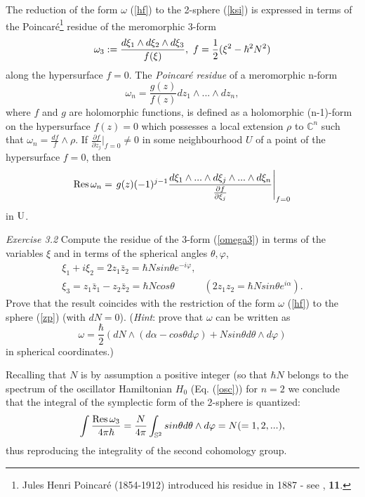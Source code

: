 The reduction of the form $\omega$ (\ref{hf}) to the 2-sphere (\ref{ksi}) is expressed in terms of the 
Poincar\'e\footnote{Jules Henri Poincar\'e (1854-1912)
introduced his residue in 1887 - see \cite{Poincare}, {\bf 11}.} residue of the meromorphic 3-form
\begin{equation}
\label{omega3}
\omega_3:= \frac{d\xi_1\wedge d\xi_2\wedge d\xi_3}{f({\bf \xi})}, \, \,
f = \frac{1}{2}({\xi}^2 - \hbar^2 N^2)
\end{equation}
along the hypersurface $f=0$. The {\it Poincar\'e residue} of a meromorphic n-form
\begin{equation}
\label{omega/n}
\omega_n = \frac{g(z)}{f(z)} dz_1\wedge ...\wedge dz_n,
\end{equation}
where $f$ and $g$ are holomorphic functions, is defined as a holomorphic 
(n-1)-form on the hypersurface $f(z) = 0$ which possesses a local extension 
$\rho$ to ${\mathbb C}^n$ such that $\omega_n =\frac{df}{f}\wedge \rho$. If
$\frac{\partial f}{\partial z_j}|_{f=0} \neq 0$ in some neighbourhood $U$ of
a point of the hypersurface $f=0$, then
\begin{equation}
\label{Res}
{\rm Res} \, \omega_n = \left. g(z) (-1)^{j-1}\frac{d\xi_{1} \wedge ... \wedge d\xi_{j} \wedge ... \wedge d\xi_{n}}{\frac{\partial f}{\partial \xi_{j}}} \right| _{f=0} %
\end{equation}
in $\rm{U}$. 

{\it Exercise 3.2} Compute the residue of the 3-form (\ref{omega3}) in terms of the variables $\xi$ and in terms of the spherical angles $\theta, \varphi$,
\begin{eqnarray}
\xi_1 + i\xi_2 = 2 z_1 {\bar z}_2 = \hbar N sin\theta e^{-i\varphi}, &  \\  \nonumber
\xi_3 =z_1{\bar z}_1 - z_2 {\bar z}_2 = \hbar N cos\theta  \; \; \; \; \; \; \;  & (2z_1 z_2 = \hbar N sin\theta e^{i\alpha}) .  
\end{eqnarray}
Prove that the result coincides with the restriction of the form $\omega$ (\ref{hf}) to the sphere (\ref{zp}) (with $dN = 0$). ({\it Hint}: prove that $\omega$ can be written as 
\begin{equation}
\label{sph}
\omega = \frac{\hbar}{2} (dN\wedge (d\alpha -cos\theta d\varphi) + 
N sin\theta d\theta \wedge d\varphi) 
\end{equation}
in spherical coordinates.) 

Recalling that $N$ is by assumption a positive integer (so that $\hbar N$ belongs to the spectrum  
of the oscillator Hamiltonian $H_0$ (Eq. (\ref{osc})) for $n=2$ we conclude that the integral of 
the symplectic form of the 2-sphere is quantized:
\begin{equation}
\label{N}
\int \frac{{\rm Res} \, \omega_3}{4\pi\hbar} = \frac{N}{4\pi} \int_{{\mathbb S}^2} 
sin\theta d\theta \wedge d\varphi = N (= 1, 2, ...),
\end{equation}
thus reproducing the integrality of the second cohomology group.

